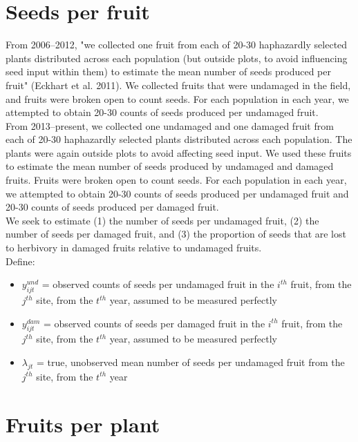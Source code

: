 \documentclass[12pt, oneside]{article}   	%
\begin{document}
\section*{Seeds per fruit}

From 2006--2012, "we collected one fruit from each of 20-30 haphazardly selected plants distributed across each population (but outside plots, to avoid influencing seed input within them) to estimate the mean number of seeds produced per fruit" (Eckhart et al. 2011). We collected fruits that were undamaged in the field, and fruits were broken open to count seeds. For each population in each year, we attempted to obtain 20-30 counts of seeds produced per undamaged fruit. \\

From 2013--present, we collected one undamaged and one damaged fruit from each of 20-30 haphazardly selected plants distributed across each population. The plants were again outside plots to avoid affecting seed input. We used these fruits to estimate the mean number of seeds produced by undamaged and damaged fruits. Fruits were broken open to count seeds. For each population in each year, we attempted to obtain 20-30 counts of seeds produced per undamaged fruit and  20-30 counts of seeds produced per damaged fruit. \\

We seek to estimate (1) the number of seeds per undamaged fruit, (2) the number of seeds per damaged fruit, and (3) the proportion of seeds that are lost to herbivory in damaged fruits relative to undamaged fruits. \\

Define:

\begin{itemize}
	\item $y^{und}_{ijt}$ = observed counts of seeds per undamaged fruit in the $i^{th}$ fruit, from the $j^{th}$ site, from the $t^{th}$ year, assumed to be measured perfectly
	\item $y^{dam}_{ijt}$ = observed counts of seeds per damaged fruit in the $i^{th}$ fruit, from the $j^{th}$ site, from the $t^{th}$ year, assumed to be measured perfectly
	\item $\lambda_{jt}$ = true, unobserved mean number of seeds per undamaged fruit from the $j^{th}$ site, from the $t^{th}$ year
\end{itemize}

\section*{Fruits per plant}
\end{document}
